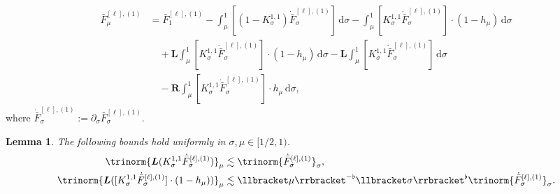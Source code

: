 \documentclass{article}
\numberwithin{equation}{section}
\newcommand{\assign}{:=}
\newcommand{\mathd}{\mathrm{d}}
\theoremstyle{plain}
\newtheorem{lemma}[theorem]{Lemma}
\theoremstyle{definition}
\begin{document}
\begin{align*}
  \bar{F}_{\mu}^{[\ell], (1)} &=  \bar{F}_1^{[\ell], (1)} - \int_{\mu}^1 [(1
  - K^{1, 1}_{\sigma}) \dot{\bar{F}}_{\sigma}^{[\ell], (1)}]\,\mathd \sigma -
  \int_{\mu}^1 [K^{1, 1}_{\sigma} \dot{\bar{F}}_{\sigma}^{[\ell], (1)}] \cdot
  (1 - h_{\mu})\,\mathd \sigma\\
 &\quad + \boldsymbol{L} \int_{\mu}^1 [K^{1, 1}_{\sigma}
  \dot{\bar{F}}_{\sigma}^{[\ell], (1)}] \cdot (1 - h_{\mu})\,\mathd \sigma -
  \boldsymbol{L} \int_{\mu}^1 [K^{1, 1}_{\sigma} \dot{\bar{F}}_{\sigma}^{[\ell],
  (1)}]\,\mathd \sigma\\
 &\quad - \boldsymbol{R} \int_{\mu}^1 [K^{1, 1}_{\sigma}
  \dot{\bar{F}}_{\sigma}^{[\ell], (1)}] \cdot h_{\mu}\, \mathd \sigma,
\end{align*}
where $\dot{\bar{F}}_{\sigma}^{[\ell], (1)} \assign \partial_{\sigma}
\bar{F}_\sigma^{[\ell], (1)}$.

\begin{lemma}
  \label{lem:estimates-local}The following bounds hold uniformly in $\sigma,
  \mu \in [1 / 2, 1)$.
  \begin{align*}
       \trinorm{ \boldsymbol{L} (K^{1, 1}_{\sigma}
       \dot{\bar{F}}_{\sigma}^{[\ell], (1)}) }_{\mu} & \lesssim 
       \trinorm{ \dot{\bar{F}}_{\sigma}^{[\ell], (1)} }_{\sigma},\\
       \trinorm{ \boldsymbol{L} ([K^{1, 1}_{\sigma}
       \dot{\bar{F}}_{\sigma}^{[\ell], (1)}] \cdot (1 - h_{\mu}))
       }_{\mu} & \lesssim  \llbracket \mu \rrbracket^{- \flat}
       \llbracket \sigma \rrbracket^{\flat}  \trinorm{
       \dot{\bar{F}}_{\sigma}^{[\ell], (1)} }_{\sigma} .
   \end{align*}
\end{lemma}
\end{document}
